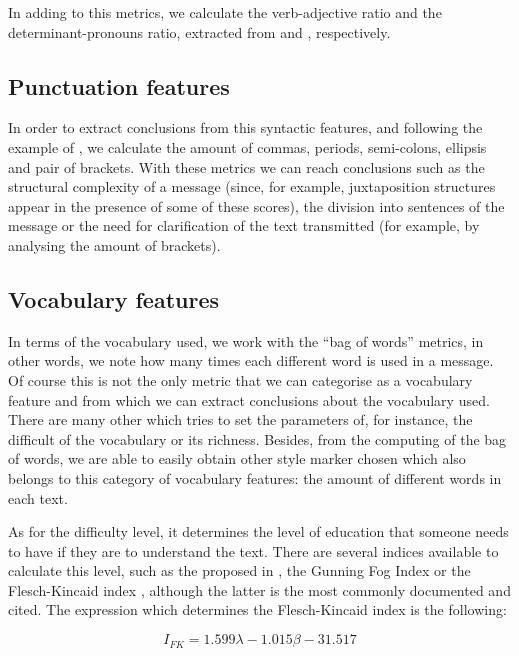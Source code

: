 In adding to this metrics, we calculate the verb-adjective ratio and the determinant-pronouns ratio, extracted from \cite{antosch1969diagnosis} and \cite{brainerd1974weighting}, respectively.

\subsection{Punctuation features}\label{sssect:punctf}

In order to extract conclusions from this syntactic features, and following the example of \cite{calix2008stylometry}, we calculate the amount of commas, periods, semi-colons, ellipsis and pair of brackets. With these metrics we can reach conclusions such as the structural complexity of a message (since, for example, juxtaposition structures appear in the presence of some of these scores), the division into sentences of the message or the need for clarification of the text transmitted (for example, by analysing the amount of brackets).

\subsection{Vocabulary features}\label{sssect:vocabf}

In terms of the vocabulary used, we work with the ``bag of words'' metrics, in other words, we note how many times each different word is used in a message. Of course this is not the only metric that we can categorise as a vocabulary feature and from which we can extract conclusions about the vocabulary used. There are many other which tries to set the parameters of, for instance, the difficult of the vocabulary or its richness. Besides, from the computing of the bag of words, we are able to easily obtain other style marker chosen which also belongs to this category of vocabulary features: the amount of different words in each text.

As for the difficulty level, it determines the level of education that someone needs to have if they are to understand the text. There are several indices available to calculate this level, such as the proposed in \cite{dale1948formula}, the Gunning Fog Index \citep{wiki:gunning} or the Flesch-Kincaid index \citep{dubay2004principles}, although the latter is the most commonly documented and cited. The expression which determines the Flesch-Kincaid index is the following:

$$
I_{FK} = 1.599\lambda-1.015\beta-31.517
$$

